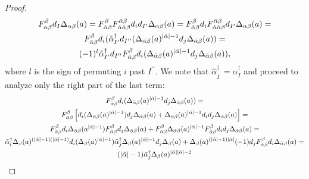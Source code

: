 \begin{cor}
\begin{proof}
  \begin{gather*}
    F_{\alpha\beta}^\beta d_I \Delta_{\alpha\beta}(a) = %
    F_{\bar\alpha\beta}^{\beta} F^{\bar\alpha\beta}_{\hat\alpha\bar\alpha\beta} d_i  d_{I^\prime} \Delta_{\alpha\beta}(a) = %
    F_{\bar\alpha\beta}^{\beta} d_i F^{\bar\alpha\beta}_{\hat\alpha\bar\alpha\beta}%
      d_{I^\prime} \Delta_{\alpha\beta}(a) = \\%
    F_{\bar\alpha\beta}^{\beta} d_i ( \hat\alpha^\dagger_{I^\prime} d_{I^{\prime\prime}}%
      ( \Delta_{\bar\alpha\beta}(a)^{\abs{\hat\alpha}-1} %
      d_j \Delta_{\bar\alpha\beta}(a) ) = \\%
    (-1)^l \hat\alpha^\dagger_{I^\prime} d_{I^{\prime\prime}} F_{\bar\alpha\beta}^\beta %
      d_i ( \Delta_{\bar\alpha\beta}(a)^{\abs{\hat\alpha}-1} %
      d_j \Delta_{\bar\alpha\beta}(a) ),%
  \end{gather*}
  where $l$ is the sign of permuting $i$ past $I^{\prime\prime}$. We note that $\hat\alpha^\dagger_{I^\prime} = \alpha^\dagger_I$ and proceed to analyze only the right part of the last term:
  \begin{gather*}
    F_{\bar\alpha\beta}^\beta d_i ( \Delta_{\bar\alpha\beta}(a)^{\abs{\hat\alpha}-1} %
      d_j \Delta_{\bar\alpha\beta}(a) ) = \\%
    F_{\bar\alpha\beta}^\beta \left[ %
      d_i ( \Delta_{\bar\alpha\beta}(a)^{\abs{\hat\alpha}-1} )%
      d_j \Delta_{\bar\alpha\beta}(a) + %
      \Delta_{\bar\alpha\beta}(a)^{\abs{\hat\alpha}-1} %
      d_i d_j \Delta_{\bar\alpha\beta}(a) \right] = \\
    F_{\bar\alpha\beta}^\beta d_i \Delta_{\bar\alpha\beta}(a^{\abs{\hat\alpha}-1}) %
      F_{\bar\alpha\beta}^\beta d_j \Delta_{\bar\alpha\beta}(a) + %
      F_{\bar\alpha\beta}^\beta \Delta_{\bar\alpha\beta}(a)^{\abs{\hat\alpha}-1} %
      F_{\bar\alpha\beta}^\beta d_i d_j \Delta_{\bar\alpha\beta}(a) = \\%
    \bar\alpha^\dagger_i %
      \Delta_{\beta} (a)^{(\abs{\hat\alpha}-1)(\abs{\bar\alpha}-1)} %
      d_i (\Delta_{\beta} (a)^{\abs{\hat\alpha}-1}) %
      \bar\alpha^\dagger_j %
      \Delta_{\beta} (a)^{\abs{\bar\alpha}-1} %
      d_j \Delta_\beta (a) %
      + %
      \Delta_\beta(a)^{(\abs{\hat\alpha}-1)\abs{\bar\alpha}} %
      (-1) d_j F_{\bar\alpha\beta}^\beta %
      d_i \Delta_{\bar\alpha\beta}(a) = \\%
    (\abs{\hat\alpha}-1)\bar\alpha^\dagger_j%
      \Delta_\beta(a)^{\abs{\hat\alpha}\abs{\bar\alpha} - 2} %

\end{gather*}
\end{proof}
\end{cor}
